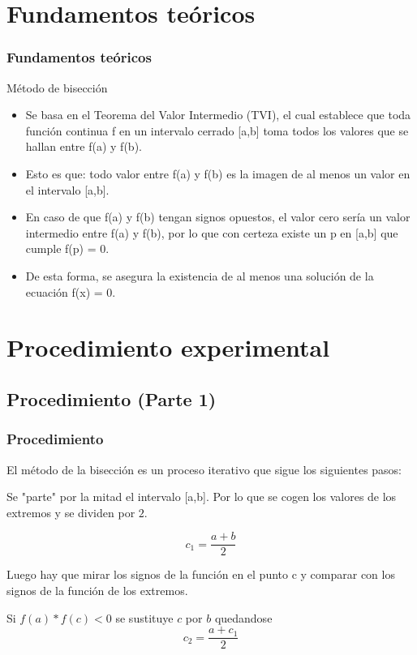 \documentclass{beamer}
\begin{document}
\section{Fundamentos teóricos}
\begin{frame}

\frametitle{Fundamentos teóricos}

\begin{block}{Método de bisección}
  \begin{itemize}
  \item
    Se basa en el Teorema del Valor Intermedio (TVI), el cual establece que toda función continua f en un intervalo cerrado [a,b] toma todos los valores que se hallan entre f(a) y f(b). 
  \pause

  \item
    Esto es que: todo valor entre f(a) y f(b) es la imagen de al menos un valor en el intervalo [a,b]. 
  \pause

  \item
    En caso de que f(a) y f(b) tengan signos opuestos, el valor cero sería un valor intermedio entre f(a) y f(b), por lo que con certeza existe un p en [a,b] que cumple f(p) = 0. 
  \pause

  \item
    De esta forma, se asegura la existencia de al menos una solución de la ecuación f(x) = 0.
  \end{itemize}
\end{block}

\end{frame}


\section{Procedimiento experimental}

\subsection{Procedimiento (Parte 1)}
\begin{frame}
\frametitle{Procedimiento}
El método de la bisección es un proceso iterativo que sigue los siguientes pasos:
\begin{block}
 \item
  Se "parte" por la mitad el intervalo [a,b]. Por lo que se cogen los valores de los extremos y se dividen por $2$.
  \begin{center}
   $$ c_1=\frac{a+b}{2} $$
  \end{center}
 \pause
 \item
  Luego hay que mirar los signos de la función en el punto c y comparar con los signos de la función de los extremos.
 \item
  Si $f(a)*f(c)<0$ se sustituye $c$ por $b$ quedandose $$c_2=\frac{a+c_1}{2}$$ \end{block}
\end{frame}
\end{document}
